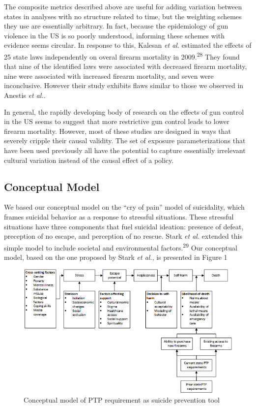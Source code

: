 \documentclass[]{article}
\begin{document}
The composite metrics described above are useful for adding variation
between states in analyses with no structure related to time, but the
weighting schemes they use are essentially arbitrary. In fact, because
the epidemiology of gun violence in the US is so poorly understood,
informing these schemes with evidence seems circular. In response to
this, Kalesan \emph{et al.} estimated the effects of 25 state laws
independently on overal firearm mortality in 2009.\textsuperscript{28}
They found that nine of the identified laws were associated with
decreased firearm mortality, nine were associated with increased firearm
mortality, and seven were inconclusive. However their study exhibits
flaws similar to those we observed in Anestis \emph{et al.}.

In general, the rapidly developing body of research on the effects of
gun control in the US seems to suggest that more restrictive gun control
leads to lower firearm mortality. However, most of these studies are
designed in ways that severely cripple their causal validity. The set of
exposure parameterizations that have been used previously all have the
potential to capture essentially irrelevant cultural variation instead
of the causal effect of a policy.

\subsection{Conceptual Model}\label{conceptual-model}

We based our conceptual model on the ``cry of pain'' model of
suicidality, which frames suicidal behavior as a response to stressful
situations. These stressful situations have three components that fuel
suicidal ideation: presence of defeat, preception of no escape, and
perception of no rescue. Stark \emph{et al.} extended this simple model
to include societal and environmental factors.\textsuperscript{29} Our
conceptual model, based on the one proposed by Stark \emph{et al.}, is
presented in Figure 1

\begin{figure}[htbp]
\centering
\includegraphics{Conceptual_model.png}
\caption{Conceptual model of PTP requirement as suicide prevention tool}
\end{figure}
\end{document}
